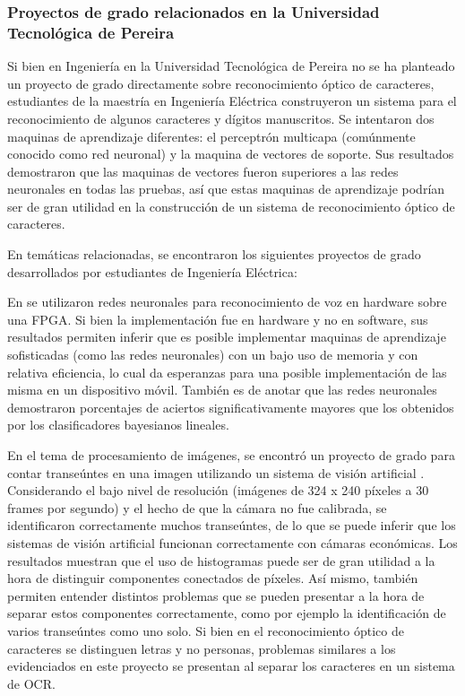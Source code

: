 \documentclass[a4paper, 11pt, oneside]{article}
\begin{document}
	\subsubsection{Proyectos de grado relacionados en la Universidad Tecnológica de Pereira}
	Si bien en Ingeniería en la Universidad Tecnológica de Pereira no se ha planteado un proyecto 
    de grado directamente sobre reconocimiento óptico de caracteres, estudiantes de la maestría en
    Ingeniería Eléctrica \cite{th2} construyeron un sistema para el reconocimiento de algunos caracteres 
    y dígitos manuscritos. Se intentaron dos maquinas de aprendizaje diferentes:
	el perceptrón multicapa (comúnmente conocido como red neuronal) y la maquina de vectores de
	soporte. Sus resultados demostraron que las maquinas de vectores fueron superiores a las redes
    neuronales en todas las pruebas, así que estas maquinas de aprendizaje podrían ser de gran 
    utilidad en la construcción de un sistema de reconocimiento óptico de caracteres.\newline

	En temáticas relacionadas, se encontraron los siguientes proyectos de grado desarrollados por 
    estudiantes de Ingeniería Eléctrica:\newline 

    En \cite{th3} se utilizaron redes neuronales para reconocimiento de voz en hardware sobre una FPGA. 
    Si bien la implementación fue en hardware y no en software, sus resultados permiten inferir que es 
    posible implementar maquinas de aprendizaje sofisticadas (como las redes neuronales) con un bajo uso
    de memoria y con relativa eficiencia, lo cual da esperanzas para una posible implementación de las 
    misma en un dispositivo móvil. También es de anotar que las redes neuronales demostraron porcentajes 
    de aciertos significativamente mayores que los obtenidos por los clasificadores bayesianos lineales.
	\newline

	En el tema de procesamiento de imágenes, se encontró un proyecto de grado para contar transeúntes en
    una imagen utilizando un sistema de visión artificial \cite{th4}. Considerando el bajo nivel de
	resolución (imágenes de 324 x 240 píxeles a 30 frames por segundo) y el hecho de que la cámara no
	fue calibrada, se identificaron correctamente muchos transeúntes, de lo que se puede inferir que los 
    sistemas de visión artificial funcionan correctamente con cámaras económicas. Los resultados muestran que
	el uso de histogramas puede ser de gran utilidad a la hora de distinguir componentes conectados de 
    píxeles. Así mismo, también permiten entender distintos problemas que se pueden presentar a la hora de
    separar estos componentes correctamente, como por ejemplo la identificación de varios transeúntes como 
    uno solo. Si bien en el reconocimiento óptico de caracteres se distinguen letras y no personas, problemas 
    similares a los evidenciados en este proyecto se presentan al separar los caracteres en un sistema de 
	OCR.\newline
	
\end{document}
